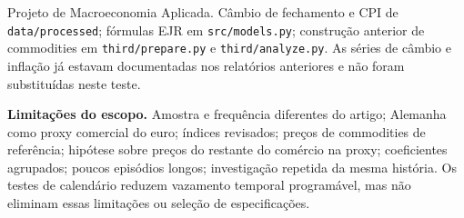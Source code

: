 \documentclass[10pt,a4paper]{article}
\begin{document}
Projeto de Macroeconomia Aplicada. Câmbio de fechamento e CPI de \texttt{data/processed}; fórmulas EJR em \texttt{src/models.py}; construção anterior de commodities em \texttt{third/prepare.py} e \texttt{third/analyze.py}. As séries de câmbio e inflação já estavam documentadas nos relatórios anteriores e não foram substituídas neste teste.

\textbf{Limitações do escopo.} Amostra e frequência diferentes do artigo; Alemanha como proxy comercial do euro; índices revisados; preços de commodities de referência; hipótese sobre preços do restante do comércio na proxy; coeficientes agrupados; poucos episódios longos; investigação repetida da mesma história. Os testes de calendário reduzem vazamento temporal programável, mas não eliminam essas limitações ou seleção de especificações.
\end{document}

